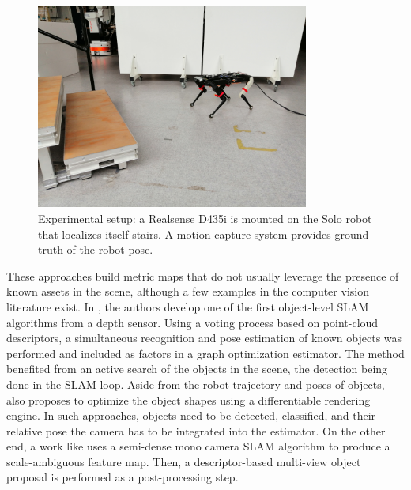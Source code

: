 \begin{figure}[h]
  \centering
  \includegraphics[width=0.80\textwidth]{figures/cosyslam/solo_closer_small.png}
  \caption{Experimental setup: a Realsense D435i is mounted on the Solo robot that localizes itself \wrt stairs. A motion capture system provides ground 
            truth of the robot pose.}
  \label{fig:solo_and_stairs}
\end{figure}

These approaches build metric maps that do not usually leverage the presence of known assets in the scene, although a few examples in the computer vision literature 
exist. In \cite{SalasMoreno2013SLAMSL}, the authors develop one of the first object-level SLAM algorithms from a depth sensor. Using a voting process based on point-cloud descriptors, 
a simultaneous recognition and pose estimation of known objects was performed and included as factors in a graph optimization estimator. 
The method benefited from an active search of the objects in the scene, the detection being done in the SLAM loop.
Aside from the robot trajectory and poses of objects, \cite{sucar2020nodeslam} also proposes to optimize the object shapes using a differentiable 
rendering engine. In such approaches, objects need to be detected, classified, and their relative pose \wrt the camera has to be integrated into the estimator. 
On the other end, a work like \cite{pillai2015monocular} uses a semi-dense mono camera SLAM algorithm to produce a scale-ambiguous feature map. 
Then, a descriptor-based multi-view object proposal is performed as a post-processing step. 



